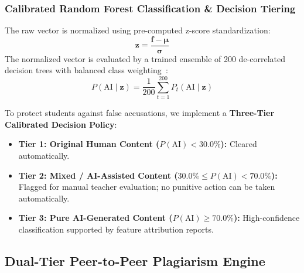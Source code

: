 \documentclass[journal]{IEEEtran}
\begin{document}
\subsubsection{Calibrated Random Forest Classification \& Decision Tiering}
The raw vector is normalized using pre-computed z-score standardization:
\begin{equation}
    \mathbf{z} = \frac{\mathbf{f} - \boldsymbol{\mu}}{\boldsymbol{\sigma}}
\end{equation}
The normalized vector is evaluated by a trained ensemble of 200 de-correlated decision trees with balanced class weighting~\cite{breiman2001random}:
\begin{equation}
    P(\text{AI} \mid \mathbf{z}) = \frac{1}{200} \sum_{t=1}^{200} P_t(\text{AI} \mid \mathbf{z})
\end{equation}

To protect students against false accusations, we implement a \textbf{Three-Tier Calibrated Decision Policy}:
\begin{itemize}
    \item \textbf{Tier 1: Original Human Content ($P(\text{AI}) < 30.0\%$):} Cleared automatically.
    \item \textbf{Tier 2: Mixed / AI-Assisted Content ($30.0\% \le P(\text{AI}) < 70.0\%$):} Flagged for manual teacher evaluation; no punitive action can be taken automatically.
    \item \textbf{Tier 3: Pure AI-Generated Content ($P(\text{AI}) \ge 70.0\%$):} High-confidence classification supported by feature attribution reports.
\end{itemize}

\subsection{Dual-Tier Peer-to-Peer Plagiarism Engine}
\end{document}
